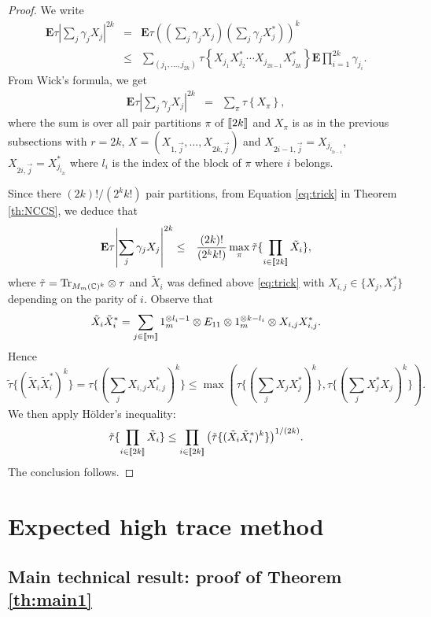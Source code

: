 \documentclass[11pt]{article}
\newcommand{\Tr}{{\rm Tr}}
\newcommand{\dE}{\mathbf {E}}
\newcommand{\dC}{\mathbb {C}}
\newcommand{\ABS}[1]{{{\left| #1 \right|}}} %
\newcommand{\BRA}[1]{{{\left\{#1\right\}}}}
\newcommand{\PAR}[1]{{{\left(#1\right)}}} %
\newcommand{\1}{1\!\!{\sf I}}
\newcommand{\INT}[1]{{{\left[\hspace{-1.4pt}\left[#1\right]\hspace{-1.4pt}\right]}}}
\begin{document}
\begin{proof}
We write
\begin{eqnarray*}
\dE \tau   \ABS{ \sum_j \gamma_j X_j }^{2k} &  = &\dE  \tau  \PAR{ \PAR{ \sum_j \gamma_j X_j }\PAR{ \sum_j \gamma_j X^*_j } }^{k}  \\
& \leq & \sum_{(j_1,\ldots,j_{2k})} \tau \BRA{ X_{j_1} X_{j_2}^* \cdots  X_{j_{2k-1}}  X_{j_{2k}}^* }\dE \prod_{i=1}^{2k} \gamma_{j_i}.
\end{eqnarray*}
From Wick's formula, we get
\begin{eqnarray*}
\dE \tau   \ABS{ \sum_j \gamma_j X_j }^{2k}& = & \sum_{\pi} \tau \BRA{ X_{\pi} },
\end{eqnarray*}
where the sum is over all pair partitions $\pi$ of $\INT{2k}$ and $X_\pi$ is as in the previous subsections with $r =2k$, $X = (X_{1,\vec j},\ldots,X_{2k,\vec j})$  and $X_{2i-1,\vec j} = X_{j_{l_{2i-1}}}$, $X_{2i,\vec j} = X^*_{j_{l_{2i}}}$ where $l_i$ is the index of the block of $\pi$ where $i$ belongs. 

Since there $(2k)! / (2^k k!)$ pair partitions, from Equation \eqref{eq:trick} in Theorem \ref{th:NCCS}, we deduce that 
\begin{eqnarray*}
\dE \tau   \ABS{ \sum_j \gamma_j X_j }^{2k} & \leq &    \frac{(2k)! }{ (2^k k!)} \max_{\pi} \tilde \tau \{  \prod_{i\in \INT{2k}}\tilde{X}_i \},
\end{eqnarray*}
where $\tilde \tau  = \Tr_{M_{m}(\dC)^k} \otimes \tau$ and $\tilde X_i$ was defined above \eqref{eq:trick} with $X_{i,j} \in \{X_j ,X_j^*\}$ depending on the parity of $i$. Observe that 
$$
 \tilde X_i  \tilde X_i^*  =  \sum_{j\in \INT{m}} 1_m^{\otimes l_i-1}\otimes E_{11} \otimes 1_m^{\otimes k-l_i}\otimes X_{i,j}  X_{i,j}^*.
$$
Hence $$\tilde \tau \{ ( \tilde X_i  \tilde X_i^* )^k \} = \tau \{  ( \sum_j X_{i,j} X_{i,j}^*)^k \} \leq \max\PAR{  \tau \{ ( \sum_j X_j X_j^* )^k\}, \tau \{ (\sum_j X_j^*X_j )^k\}} .$$
We then apply H\"older's inequality:
$$
 \tilde \tau \{  \prod_{i\in \INT{2k}}\tilde{X}_i \}\leq \prod_{i \in \INT{2k}}  \PAR{  \tilde \tau \{  (\tilde{X}_i\tilde{X}_i^*)^k \} }^{1/(2k)}.
$$
The conclusion follows.
 \end{proof}

\section{Expected high trace method}
\label{sec:FK}


\subsection{Main technical result: proof of Theorem \ref{th:main1}}
\end{document}
